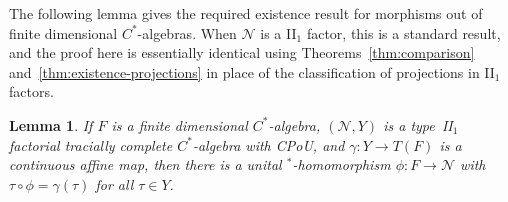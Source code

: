 \documentclass[a4paper,11pt]{amsart}
\newtheorem{lemma}[theorem]{Lemma}
\theoremstyle{definition}
\numberwithin{equation}{section}
\numberwithin{theorem}{section}
\begin{document}
The following lemma gives the required existence result for morphisms out of finite dimensional $C^*$-algebras.  When $\mathcal N$ is a II$_1$ factor, this is a standard result, and the proof here is essentially identical using Theorems~\ref{thm:comparison} and~\ref{thm:existence-projections} in place of the classification of projections in II$_1$ factors.

\begin{lemma}
	\label{lem:finite-dim-existence}
	If $F$ is a finite dimensional $C^*$-algebra, $(\mathcal N, Y)$ is a type~{\rm II}$_1$ factorial tracially complete $C^*$-algebra with CPoU, and $\gamma \colon Y \rightarrow T(F)$ is a continuous affine map, then there is a unital $^*$-homomorphism $\phi \colon F \rightarrow \mathcal N$ with \mbox{$\tau \circ \phi = \gamma(\tau)$} for all $\tau \in Y$.
\end{lemma}
\end{document}
